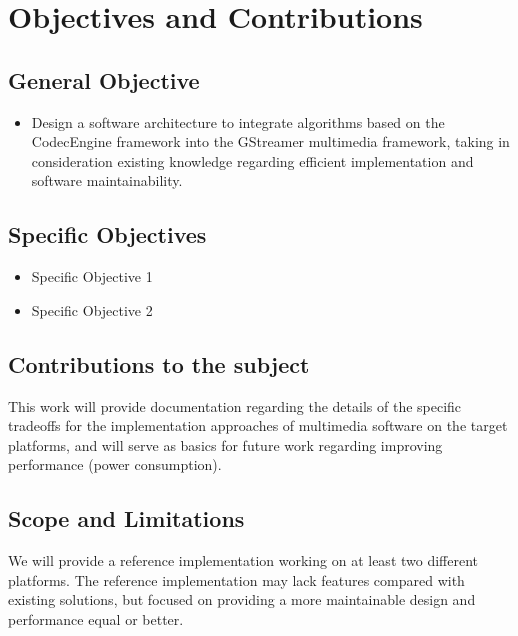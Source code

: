 \chapter{Objectives and Contributions}

\section{General Objective}

\begin{itemize}
\item Design a software architecture to integrate algorithms based on the CodecEngine framework into the GStreamer multimedia framework, taking in consideration existing knowledge regarding efficient implementation and software maintainability.
\end{itemize}

\section{Specific Objectives}
\begin{itemize}
\item Specific Objective 1
\item Specific Objective 2
\end{itemize}

\section{Contributions to the subject}
This work will provide documentation regarding the details of the specific tradeoffs for the implementation approaches of multimedia software on the target platforms, and will serve as basics for future work regarding improving performance (power consumption).

\section{Scope and Limitations}
We will provide a reference implementation working on at least two different platforms. The reference implementation may lack features compared with existing solutions, but focused on providing a more maintainable design and performance equal or better.
 